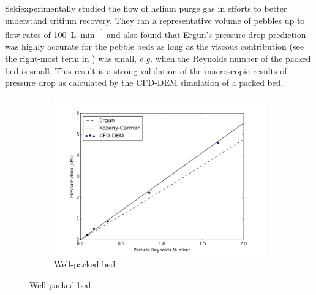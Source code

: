 Seki\etal experimentally studied the flow of helium purge gas in efforts to better understand tritium recovery.\cite{Seki2013a} They ran a representative volume of pebbles up to flow rates of \SI{100}{\liter\per\minute} and also found that Ergun's pressure drop prediction was highly accurate for the pebble beds as long as the viscous contribution (see the right-most term in ) was small, \textit{e.g.} when the Reynolds number of the packed bed is small. This result is a strong validation of the macroscopic results of pressure drop as calculated by the CFD-DEM simulation of a packed bed.

\begin{figure}
        \centering
        \begin{subfigure}[b]{0.7\textwidth}
                \includegraphics[width=\textwidth]{figures/pressureDrops-full.png}
                \caption{Well-packed bed}
                \label{fig:pressure-drop-full}
        \end{subfigure}%
        

\end{figure}
